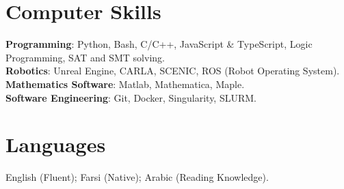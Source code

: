 \documentclass[margin]{res}
\begin{document}
\begin{resume}
\section{Computer Skills}
\textbf{Programming}:
Python,
Bash,
C/C++,
JavaScript \& TypeScript,
Logic Programming,
SAT and SMT solving. \\
\textbf{Robotics}:
Unreal Engine,
CARLA,
SCENIC,
ROS (Robot Operating System).\\
\textbf{Mathematics Software}:
Matlab,
Mathematica,
Maple. \\
\textbf{Software Engineering}:
Git,
Docker,
Singularity,
SLURM.


\section{Languages}
English (Fluent); 
Farsi (Native); 
Arabic (Reading Knowledge).




\end{resume}
\end{document}
